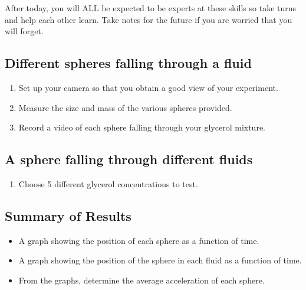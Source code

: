 After today, you will ALL be expected to be experts at these skills so take turns and help each other learn.
Take notes for the future if you are worried that you will forget. 

\subsection{Different spheres falling through a fluid}
\begin{enumerate}
\item Set up your camera so that you obtain a good view of your experiment. 
\item Measure the size and mass of the various spheres provided.
\item Record a video of each sphere falling through your glycerol mixture.
\end{enumerate}

\subsection{A sphere falling through different fluids}
\begin{enumerate}
\item Choose 5 different glycerol concentrations to test.
\end{enumerate}

\subsection*{Summary of Results}
\begin{itemize}
\item A graph showing the position of each sphere as a function of time.
\item A graph showing the position of the sphere in each fluid as a function of time.
\item From the graphs, determine the average acceleration of each sphere.
\end{itemize}

